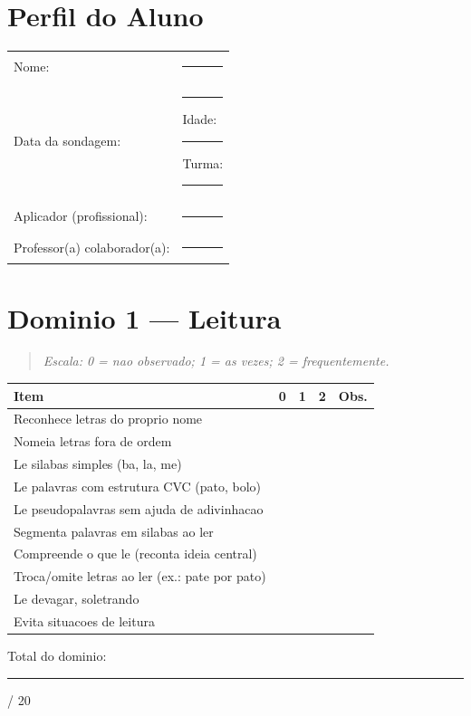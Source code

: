 \documentclass[a4paper,11pt]{book}
\begin{document}
\section{Perfil do Aluno}
\begin{tabular}{@{}ll@{}}
Nome: & \rule{8cm}{0.3pt}\\
Data da sondagem: & \rule{4cm}{0.3pt}\qquad Idade: \rule{2cm}{0.3pt}\qquad Turma: \rule{2cm}{0.3pt}\\
Aplicador (profissional): & \rule{7cm}{0.3pt}\\
Professor(a) colaborador(a): & \rule{6.5cm}{0.3pt}\\
\end{tabular}
\medskip

\section{Dominio 1 --- Leitura}
\begin{quote}\itshape Escala: 0 = nao observado; 1 = as vezes; 2 = frequentemente.\end{quote}
\begin{tabular}{@{}p{10.5cm}ccc p{0.5cm}@{}}\toprule
Item & 0 & 1 & 2 & Obs. \\\midrule
Reconhece letras do proprio nome & & & & \\
Nomeia letras fora de ordem & & & & \\
Le silabas simples (ba, la, me) & & & & \\
Le palavras com estrutura CVC (pato, bolo) & & & & \\
Le pseudopalavras sem ajuda de adivinhacao & & & & \\
Segmenta palavras em silabas ao ler & & & & \\
Compreende o que le (reconta ideia central) & & & & \\
Troca/omite letras ao ler (ex.: pate por pato) & & & & \\
Le devagar, soletrando & & & & \\
Evita situacoes de leitura & & & & \\
\bottomrule\end{tabular}
\vspace{0.2cm}\noindent\small Total do dominio: \rule{1cm}{0.3pt} / 20\par\medskip
\end{document}
